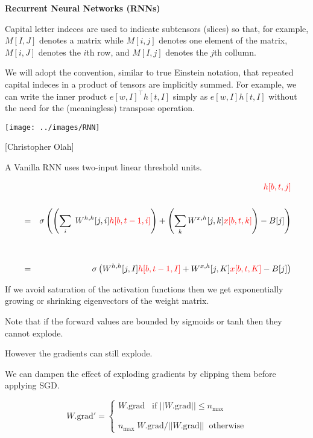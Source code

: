 {\centerline{\bf Recurrent Neural Networks (RNNs)}


Capital letter indeces are used to indicate subtensors (slices) so that, for example,  $M[I,J]$ denotes a matrix
while $M[i,j]$ denotes one element of the matrix, $M[i,J]$ denotes the $i$th row, and $M[I,j]$ denotes the $j$th collumn.

\vfill
We will adopt the convention, similar to true Einstein notation, that repeated capital indeces in a product of tensors are implicitly summed.  For example, we can write the inner product $e[w,I]^\top h[t,I]$ simply as $e[w,I]h[t,I]$ without the need for the (meaningless) transpose operation.


\centerline{\texttt{[image: ../images/RNN]}}
\centerline{{\large [Christopher Olah]}}

A Vanilla RNN uses two-input linear threshold units.

{\huge
\begin{eqnarray*}
& & {\color{red} h[b,t,j]} \\
\\
& = & \sigma\left(\left(\sum_i\;W^{h,h}[j,i]{\color{red} h[b,t-1,i]}\right) + \left(\sum_k W^{x,h}[j,k]{\color{red} x[b,t,k]}\right) - B[j]\right) \\
\\
\\
& = & \sigma\left(W^{h,h}[j,I]{\color{red} h[b,t-1,I]} + W^{x,h}[j,K]{\color{red} x[b,t,K]} - B[j]\right)
\end{eqnarray*}
}


\vfill
If we avoid saturation of the activation functions then we get exponentially growing or shrinking eigenvectors of the weight matrix.

\vfill
Note that if the forward values are bounded by sigmoids or tanh then they cannot explode.

\vfill
However the gradients can still explode.


\vfill
We can dampen the effect of exploding gradients by clipping them before applying SGD.

\vfill
$$W.\mathrm{grad'} = \left\{\begin{array}{l} W.\mathrm{grad} \;\;\;\mbox{if $||W.\mathrm{grad}|| \leq n_{\mathrm{max}}$} \\
                                                      \\ \\
                                                      n_{\mathrm{max}} \; W.\mathrm{grad} / ||W.\mathrm{grad}|| \;\; \mbox{otherwise}
\end{array} \right.$$

}
